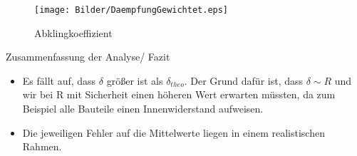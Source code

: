 \documentclass[11pt]{beamer}
\begin{document}
\begin{frame}
\begin{figure}[H]
\caption{Abklingkoeffizient}
\centering
\texttt{[image: Bilder/DaempfungGewichtet.eps]}
\end{figure}
\end{frame}

\begin{frame}{Zusammenfassung der Analyse/ Fazit}
\begin{itemize}

\item Es fällt auf, dass $\delta$ größer ist als $\delta_{theo}$. Der Grund dafür ist, dass $\delta \sim R$ und wir bei R mit Sicherheit einen höheren Wert erwarten müssten, da zum Beispiel alle Bauteile einen Innenwiderstand aufweisen. 
\newline
\item Die jeweiligen Fehler auf die Mittelwerte liegen in einem realistischen Rahmen.
\end{itemize}
\end{frame}
\end{document}

